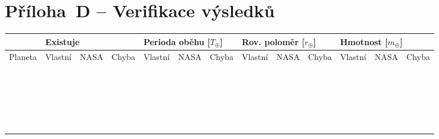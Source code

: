 \documentclass[a4paper,12pt]{article}
\begin{document}
{{{{{{{{{{{{{\section*{Příloha~D -- Verifikace výsledků}\label{priloha_d}
\begin{table}[!ht]
	\def\arraystretch{1.2}
	\setlength{\tabcolsep}{1pt}
	\begin{tabularx}{\textwidth}{|p{50pt}|X|X|X|X|X|X|X|X|X|X|X|X|}
		\hline
		\rowcolor{lightgray}
		 & \multicolumn{3}{|l|}{Existuje} & \multicolumn{3}{|l|}{Perioda oběhu [$T_\oplus$]} & \multicolumn{3}{|l|}{Rov. poloměr [$r_\oplus$]} & \multicolumn{3}{|l|}{Hmotnost [$m_\oplus$]} \\	
		\hline	
		\rowcolor{lightgray}
		Planeta & Vlastní & NASA & Chyba & Vlastní & NASA & Chyba & Vlastní & NASA & Chyba & Vlastní & NASA & Chyba \\
		\hline	
		& & & & & & & & & & & & \\
		\hline		
		& & & & & & & & & & & & \\
		\hline		
		& & & & & & & & & & & & \\
		\hline		
		& & & & & & & & & & & & \\
		\hline		
		& & & & & & & & & & & & \\
		\hline		
		& & & & & & & & & & & & \\
		\hline		
		& & & & & & & & & & & & \\
		\hline		
		& & & & & & & & & & & & \\
		\hline		
		& & & & & & & & & & & & \\
		\hline		
		& & & & & & & & & & & & \\
		\hline		
		& & & & & & & & & & & & \\
		\hline		
		& & & & & & & & & & & & \\
		\hline		
		& & & & & & & & & & & & \\
		\hline		
		& & & & & & & & & & & & \\
		\hline		
		& & & & & & & & & & & & \\
		\hline		
		& & & & & & & & & & & & \\
		\hline		
		& & & & & & & & & & & & \\
		\hline		
		& & & & & & & & & & & & \\
		\hline		
		& & & & & & & & & & & & \\
		\hline		
		& & & & & & & & & & & & \\
		\hline		
		& & & & & & & & & & & & \\
		\hline		
		& & & & & & & & & & & & \\

\end{tabularx}
\end{table}}}}}}}}}}}}}}
\end{document}
